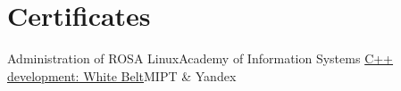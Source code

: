 \section{Certificates}\label{sec:certificates}
\resumeSubHeadingListStart
\resumeSmallSubheading
{Administration of ROSA Linux}{Academy of Information Systems}
\resumeSmallSubheading
{\href{https://coursera.org/share/cc73c6a33e5a2d6124d6c2842b62343e}{C++ development: White Belt}}{MIPT \& Yandex}
\resumeSubHeadingListEnd